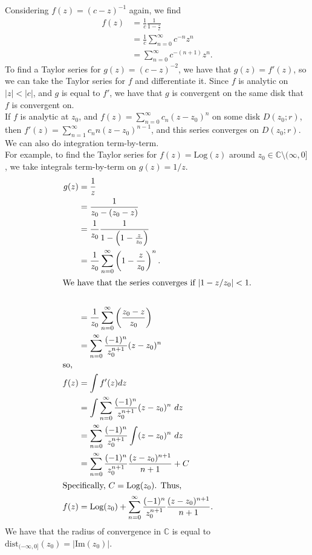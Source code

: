 \documentclass[10pt]{extarticle}
\newcommand{\C}{\mathbb{C}}
\begin{document}
  Considering $f(z) = (c-z)^{-1}$ again, we find 
  \begin{align*}
    f(z) &= \frac{1}{c}\frac{1}{1-\frac{z}{c}}\\
         &= \frac{1}{c}\sum_{n=0}^{\infty}c^{-n}z^n \tag*{true iff $|z/c|<1$}\\
         &= \sum_{n=0}^{\infty}c^{-(n+1)}z^n.
  \end{align*}
  To find a Taylor series for $g(z) = (c-z)^{-2}$, we have that $g(z) = f'(z)$, so we can take the Taylor series for $f$ and differentiate it. Since $f$ is analytic on $|z|<|c|$, and $g$ is equal to $f'$, we have that $g$ is convergent on the same disk that $f$ is convergent on.\\

  If $f$ is analytic at $z_0$, and $f(z) = \sum_{n=0}^{\infty}c_n(z-z_0)^n$ on some disk $D(z_0;r)$, then $f'(z) = \sum_{n=1}^{\infty}c_n n (z-z_0)^{n-1}$, and this series converges on $D(z_0;r)$. We can also do integration term-by-term.\\

  For example, to find the Taylor series for $f(z) = \text{Log}(z)$ around $z_0\in \C\setminus (\infty,0]$, we take integrals term-by-term on $g(z) = 1/z$.
  \begin{align*}
    g(z) &= \frac{1}{z}\\
         &= \frac{1}{z_0-(z_0 - z)}\\
         &= \frac{1}{z_0}\frac{1}{1-\left(1-\frac{z}{z_0}\right)}\\
         &= \frac{1}{z_0}\sum_{n=0}^{\infty}\left(1-\frac{z}{z_0}\right)^n.\\
   \intertext{We have that the series converges if $|1-z/z_0| < 1$.}\\
         &= \frac{1}{z_0}\sum_{n=0}^{\infty}\left(\frac{z_0-z}{z_0}\right)\\
         &= \sum_{n=0}^{\infty}\frac{(-1)^n}{z_0^{n+1}}(z-z_0)^{n}\\
    \intertext{so,}
    f(z) &= \int f'(z)dz\\
         &= \int \sum_{n=0}^{\infty}\frac{(-1)^n}{z_0^{n+1}}(z-z_0)^n~dz\\
         &= \sum_{n=0}^{\infty}\frac{(-1)^{n}}{z_0^{n+1}}\int(z-z_0)^n~dz\\
         &= \sum_{n=0}^{\infty}\frac{(-1)^{n}}{z_0^{n+1}}\frac{(z-z_0)^{n+1}}{n+1} + C\\
         \intertext{Specifically, $C = \text{Log}(z_0)$. Thus,}
    f(z) &= \text{Log}(z_0) + \sum_{n=0}^{\infty}\frac{(-1)^{n}}{z_0^{n+1}}\frac{(z-z_0)^{n+1}}{n+1}.
  \end{align*}
  We have that the radius of convergence in $\C$ is equal to $\text{dist}_{(-\infty,0]}(z_0) = |\text{Im}(z_0)|$.\\
\end{document}
